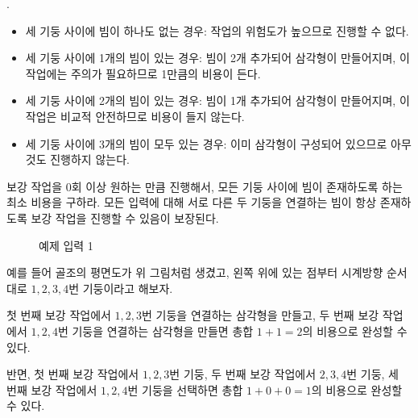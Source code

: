 \begin{problem}{\probno{}. \probtitle{}}
\begin{itemize}[noitemsep]
    \item 세 기둥 사이에 빔이 하나도 없는 경우: 작업의 위험도가 높으므로 진행할 수 없다.
    \item 세 기둥 사이에 1개의 빔이 있는 경우: 빔이 2개 추가되어 삼각형이 만들어지며, 이 작업에는 주의가 필요하므로 1만큼의 비용이 든다.
    \item 세 기둥 사이에 2개의 빔이 있는 경우: 빔이 1개 추가되어 삼각형이 만들어지며, 이 작업은 비교적 안전하므로 비용이 들지 않는다.
    \item 세 기둥 사이에 3개의 빔이 모두 있는 경우: 이미 삼각형이 구성되어 있으므로 아무것도 진행하지 않는다.
\end{itemize}

보강 작업을 0회 이상 원하는 만큼 진행해서, 모든 기둥 사이에 빔이 존재하도록 하는 최소 비용을 구하라. 모든 입력에 대해 서로 다른 두 기둥을 연결하는 빔이 항상 존재하도록 보강 작업을 진행할 수 있음이 보장된다.

\begin{figure}[!h]
    \centering
    \caption{예제 입력 1}
\end{figure}

예를 들어 골조의 평면도가 위 그림처럼 생겼고, 왼쪽 위에 있는 점부터 시계방향 순서대로 $1, 2, 3, 4$번 기둥이라고 해보자.

첫 번째 보강 작업에서 $1, 2, 3$번 기둥을 연결하는 삼각형을 만들고, 두 번째 보강 작업에서 $1, 2, 4$번 기둥을 연결하는 삼각형을 만들면 총합 $1+1=2$의 비용으로 완성할 수 있다.

반면, 첫 번째 보강 작업에서 $1, 2, 3$번 기둥, 두 번째 보강 작업에서 $2, 3, 4$번 기둥, 세 번째 보강 작업에서 $1, 2, 4$번 기둥을 선택하면 총합 $1+0+0=1$의 비용으로 완성할 수 있다.


\end{problem}
